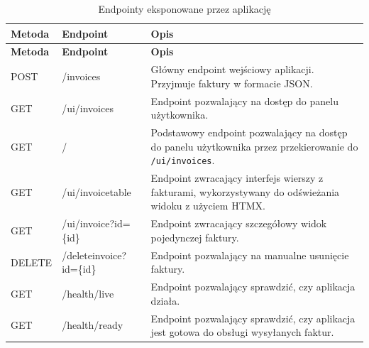\begin{small}
\begin{longtable}{>{\raggedright\arraybackslash}p{3cm} >{\raggedright\arraybackslash}p{4cm} >{\raggedright\arraybackslash}p{6cm}}
\caption{Endpointy eksponowane przez aplikację}
\label{tab:app_endpoints} \\
\toprule
\textbf{Metoda} & \textbf{Endpoint} & \textbf{Opis} \\
\midrule
\endfirsthead

\toprule
\textbf{Metoda} & \textbf{Endpoint} & \textbf{Opis} \\
\midrule
\endhead

\bottomrule
\endfoot

POST & /invoices & Główny endpoint wejściowy aplikacji. Przyjmuje faktury w formacie JSON. \\
GET & /ui/invoices & Endpoint pozwalający na dostęp do panelu użytkownika. \\
GET & / & Podstawowy endpoint pozwalający na dostęp do panelu użytkownika przez przekierowanie do \texttt{/ui/invoices}. \\
GET & /ui/invoicetable & Endpoint zwracający interfejs wierszy z fakturami, wykorzystywany do odświeżania widoku z użyciem HTMX. \\
GET & /ui/invoice?id=\{id\} & Endpoint zwracający szczegółowy widok pojedynczej faktury. \\
DELETE & /deleteinvoice?id=\{id\} & Endpoint pozwalający na manualne usunięcie faktury. \\
GET & /health/live & Endpoint pozwalający sprawdzić, czy aplikacja działa. \\
GET & /health/ready & Endpoint pozwalający sprawdzić, czy aplikacja jest gotowa do obsługi wysyłanych faktur. \\
\end{longtable}
\end{small}
